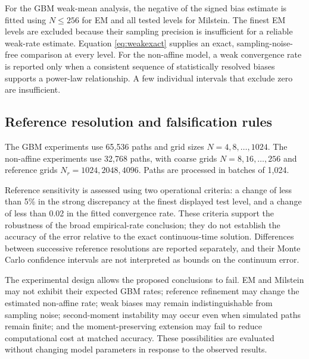 For the GBM weak-mean analysis, the negative of the signed bias estimate is fitted using $N\leq256$ for EM and all tested levels for Milstein. The finest EM levels are excluded because their sampling precision is insufficient for a reliable weak-rate estimate. Equation \eqref{eq:weakexact} supplies an exact, sampling-noise-free comparison at every level. For the non-affine model, a weak convergence rate is reported only when a consistent sequence of statistically resolved biases supports a power-law relationship. A few individual intervals that exclude zero are insufficient.

\subsection{Reference resolution and falsification rules}
The GBM experiments use 65,536 paths and grid sizes $N=4,8,\ldots,1024$. The non-affine experiments use 32,768 paths, with coarse grids $N=8,16,\ldots,256$ and reference grids $N_r=1024,2048,4096$. Paths are processed in batches of 1,024.

Reference sensitivity is assessed using two operational criteria: a change of less than 5\% in the strong discrepancy at the finest displayed test level, and a change of less than 0.02 in the fitted convergence rate. These criteria support the robustness of the broad empirical-rate conclusion; they do not establish the accuracy of the error relative to the exact continuous-time solution. Differences between successive reference resolutions are reported separately, and their Monte Carlo confidence intervals are not interpreted as bounds on the continuum error.

The experimental design allows the proposed conclusions to fail. EM and Milstein may not exhibit their expected GBM rates; reference refinement may change the estimated non-affine rate; weak biases may remain indistinguishable from sampling noise; second-moment instability may occur even when simulated paths remain finite; and the moment-preserving extension may fail to reduce computational cost at matched accuracy. These possibilities are evaluated without changing model parameters in response to the observed results.

